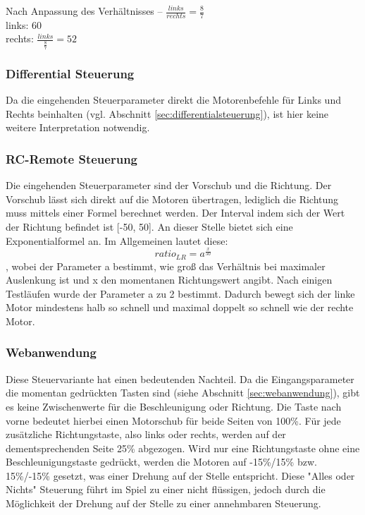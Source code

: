 Nach Anpassung des Verhältnisses -- $\frac{links}{rechts} = \frac{8}{7}$ \\
	links: 60 \\
	rechts: $\frac{links}{\frac{8}{7}} = 52$


\subsubsection{Differential Steuerung}
Da die eingehenden Steuerparameter direkt die Motorenbefehle für Links und Rechts beinhalten (vgl. Abschnitt \ref{sec:differentialsteuerung}), ist hier keine weitere Interpretation notwendig. 

\subsubsection{RC-Remote Steuerung}
Die eingehenden Steuerparameter sind der Vorschub und die Richtung. Der Vorschub lässt sich direkt auf die Motoren übertragen, lediglich die Richtung muss mittels einer Formel berechnet werden. Der Interval indem sich der Wert der Richtung befindet ist [-50, 50]. An dieser Stelle bietet sich eine Exponentialformel an. 
Im Allgemeinen lautet diese: 
{\Large \[ratio_{LR} = a^{\frac{x}{50}}\]},
wobei der Parameter a bestimmt, wie groß das Verhältnis bei maximaler Auslenkung ist und x den momentanen Richtungswert angibt.
Nach einigen Testläufen wurde der Parameter a zu 2 bestimmt. Dadurch bewegt sich der linke Motor mindestens halb so schnell und maximal doppelt so schnell wie der rechte Motor.

\subsubsection{Webanwendung}
Diese Steuervariante hat einen bedeutenden Nachteil. Da die Eingangsparameter die momentan gedrückten Tasten sind (siehe Abschnitt \ref{sec:webanwendung}), gibt es keine Zwischenwerte für die Beschleunigung oder Richtung. Die Taste nach vorne bedeutet hierbei einen Motorschub für beide Seiten von 100\%. Für jede zusätzliche Richtungstaste, also links oder rechts, werden auf der dementsprechenden Seite 25\% abgezogen. Wird nur eine Richtungstaste ohne eine Beschleunigungstaste gedrückt, werden die Motoren auf -15\%/15\% bzw. 15\%/-15\% gesetzt, was einer Drehung auf der Stelle entspricht. Diese "Alles oder Nichts" Steuerung führt im Spiel zu einer nicht flüssigen, jedoch durch die Möglichkeit der Drehung auf der Stelle zu einer annehmbaren Steuerung.

